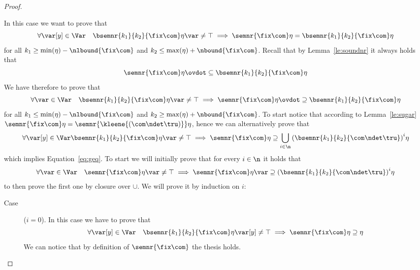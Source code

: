 \begin{proof}
\begin{inductive}
    \case{\(\fix\com\)} In this case we want to prove that
    \begin{equation*}
      \forall \var[y] \in \Var \quad \bsemnr{k_1}{k_2}{\fix\com}\eta\var \neq \top
      \implies
      \semnr{\fix\com}\eta = \bsemnr{k_1}{k_2}{\fix\com}\eta
    \end{equation*}
    for all \(k_1 \geq \min(\eta) - \nlbound{\fix\com}\) and
    \(k_2 \leq \max(\eta) + \nbound{\fix\com}\). Recall that by
    Lemma~\ref{le:soundnr} it always holds that
    \begin{equation*}
      \semnr{\fix\com}\eta \ovdot\subseteq \bsemnr{k_1}{k_2}{\fix\com}\eta
    \end{equation*}
    We have therefore to prove that 
    \begin{equation}\label{eq:geq}
      \forall \var\in\Var \quad \bsemnr{k_1}{k_2}{\fix\com}\eta\var \neq \top
      \implies
      \semnr{\fix\com}\eta \ovdot\supseteq \bsemnr{k_1}{k_2}{\fix\com}\eta
    \end{equation}
    for all \(k_1 \leq \min(\eta) - \nlbound{\fix\com}\) and
    \(k_2 \geq \max(\eta) + \nbound{\fix\com}\). To start notice that
    according to Lemma~\ref{le:sugar}
    \(\semnr{\fix\com}\eta = \semnr{\kleene{(\com\ndet\tru)}}\eta\),
    hence we can alternatively prove that
    \begin{equation*}
      \forall \var[y] \in \Var \bsemnr{k_1}{k_2}{\fix\com}\eta\var \neq \top
      \implies
      \semnr{\fix\com}\eta \supseteq \bigcup_{i\in\n} {\left(\bsemnr{k_1}{k_2}{\com \ndet \tru}\right)}^i\eta
    \end{equation*}
    which implies Equation~\ref{eq:geq}. To start we will initially
    prove that for every \(i\in\n\) it holds that
    \begin{equation*}
      \forall \var \in \Var\quad \semnr{\fix\com}\eta\var \neq \top
      \implies
      \semnr{\fix\com}\eta\var \supseteq
      {\left(\bsemnr{k_1}{k_2}{\com \ndet \tru}\right)}^i\eta
    \end{equation*}
    to then prove the first one by closure over \(\cup\). We will
    prove it by induction on \(i\):
    \begin{description}
      
    \item[Case] (\(i=0\)). In this case we have to prove that
      \begin{equation*}
        \forall \var[y] \in \Var \quad \bsemnr{k_1}{k_2}{\fix\com}\eta\var[y] \neq \top
        \implies
        \semnr{\fix\com}\eta \supseteq \eta
      \end{equation*}
      We can notice that by definition of \(\semnr{\fix\com}\) the
      thesis holds.
      

\end{description}
\end{inductive}
\end{proof}
